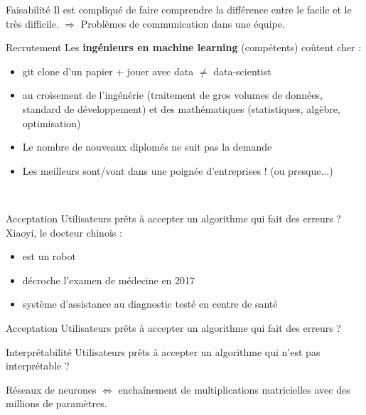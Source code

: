 \begin{frame}{Faisabilité}
  Il est compliqué de faire comprendre la différence entre le facile et le très difficile.
  $\Rightarrow$ Problèmes de communication dans une équipe.
\end{frame}

\begin{frame}{Recrutement}
  Les \textbf{ingénieurs en machine learning} (compétents) coûtent cher :
  \begin{itemize}
    \item git clone d'un papier + jouer avec data $\neq$ data-scientist
    \item au croisement de l'ingénérie (traitement de gros volumes de données, standard de développement) et des mathématiques (statistiques, algèbre, optimisation)
    \item Le nombre de nouveaux diplomés ne suit pas la demande
    \item Les meilleurs sont/vont dans une poignée d'entreprises ! (ou presque...)
  \end{itemize}
  \begin{minipage}[l]{0.55\linewidth}
    ~
  \end{minipage}\hfill
  \begin{minipage}[l]{0.44\linewidth}
  \end{minipage}\hfill
\end{frame}

\begin{frame}{Acceptation}
  Utilisateurs prêts à accepter un algorithme qui fait des erreurs ?
  Xiaoyi, le docteur chinois :
  \begin{itemize}
    \item est un robot
    \item décroche l'examen de médecine en 2017
    \item système d’assistance au diagnostic testé en centre de santé
  \end{itemize}
\end{frame}

\begin{frame}{Acceptation}
  Utilisateurs prêts à accepter un algorithme qui fait des erreurs ?
\end{frame}

\begin{frame}{Interprétabilité}
  Utilisateurs prêts à accepter un algorithme qui n'est pas interprétable ?

  Réseaux de neurones $\iff$ enchaînement de multiplications matricielles avec des millions de paramètres.

\end{frame}
